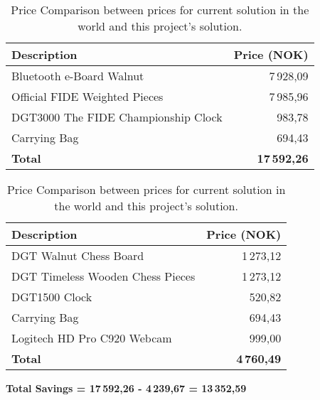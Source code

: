 \begin{table}
\centering
\caption{Price Comparison between prices for current solution in the world and this project's solution. \cite{dgtshop:prices}}
\label{tab:price-comparison}
\begin{tabular}{lr}
\toprule
Description & {Price (NOK)} \\
\midrule
Bluetooth e-Board Walnut & 7\,928,09 \\
Official FIDE Weighted Pieces & 7\,985,96 \\
DGT3000 The FIDE Championship Clock & 983,78 \\
Carrying Bag & 694,43 \\
\midrule
\textbf{Total} & \textbf{17\,592,26} \\
\bottomrule
\end{tabular}
\end{table}

\vspace{1cm}

\begin{table}
\centering
\caption{Price Comparison between prices for current solution in the world and this project's solution. \cite{dgtshop:prices}}
\label{tab:price-comparison}
\begin{tabular}{lr}
\toprule
Description & {Price (NOK)} \\
\midrule
DGT Walnut Chess Board & 1\,273,12 \\
DGT Timeless Wooden Chess Pieces & 1\,273,12 \\
DGT1500 Clock & 520,82 \\
Carrying Bag & 694,43 \\
Logitech HD Pro C920 Webcam & 999,00 \\
\midrule
\textbf{Total} & \textbf{4\,760,49} \\
\bottomrule
\end{tabular}
\end{table}

\begin{center}
    \textbf{Total Savings = 17\,592,26 - 4\,239,67 = 13\,352,59}
\end{center}



